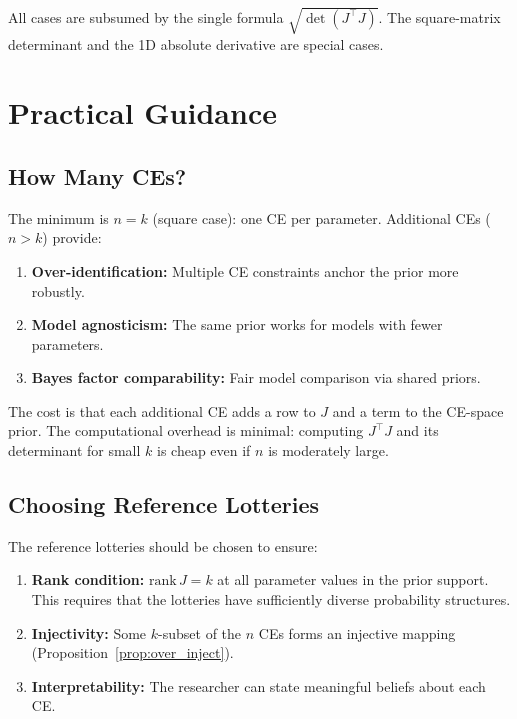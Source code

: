 \documentclass[11pt,a4paper]{article}
\theoremstyle{definition}
\begin{document}
All cases are subsumed by the single formula
$\sqrt{\det(J^\top J)}$. The square-matrix determinant and the
1D absolute derivative are special cases.


\section{Practical Guidance}
\label{sec:practical}

\subsection{How Many CEs?}

The minimum is $n = k$ (square case): one CE per parameter. Additional CEs
($n > k$) provide:
\begin{enumerate}
    \item \textbf{Over-identification:} Multiple CE constraints anchor the
    prior more robustly.
    \item \textbf{Model agnosticism:} The same prior works for models with
    fewer parameters.
    \item \textbf{Bayes factor comparability:} Fair model comparison via
    shared priors.
\end{enumerate}

The cost is that each additional CE adds a row to $J$ and a term to the
CE-space prior. The computational overhead is minimal: computing $J^\top J$
and its determinant for small $k$ is cheap even if $n$ is moderately large.

\subsection{Choosing Reference Lotteries}

The reference lotteries should be chosen to ensure:
\begin{enumerate}
    \item \textbf{Rank condition:} $\text{rank}\, J = k$ at all parameter
    values in the prior support. This requires that the lotteries have
    sufficiently diverse probability structures.
    \item \textbf{Injectivity:} Some $k$-subset of the $n$ CEs forms an
    injective mapping (Proposition~\ref{prop:over_inject}).
    \item \textbf{Interpretability:} The researcher can state meaningful
    beliefs about each CE.
\end{enumerate}
\end{document}
